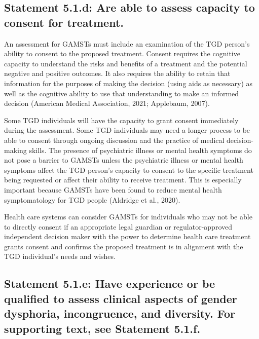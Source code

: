 \documentclass[
]{book}
\begin{document}
\hypertarget{statement-5.1.d-are-able-to-assess-capacity-to-consent-for-treatment.}{%
\subsection*{Statement 5.1.d: Are able to assess capacity to consent for treatment.}\label{statement-5.1.d-are-able-to-assess-capacity-to-consent-for-treatment.}}

An assessment for GAMSTs must include an
examination of the TGD person's ability to consent
to the proposed treatment. Consent requires the
cognitive capacity to understand the risks and
benefits of a treatment and the potential negative
and positive outcomes. It also requires the ability
to retain that information for the purposes of
making the decision (using aids as necessary) as
well as the cognitive ability to use that understanding to make an informed decision (American
Medical Association, 2021; Applebaum, 2007).

Some TGD individuals will have the capacity to
grant consent immediately during the assessment.
Some TGD individuals may need a longer process
to be able to consent through ongoing discussion
and the practice of medical decision-making skills.
The presence of psychiatric illness or mental health
symptoms do not pose a barrier to GAMSTs unless
the psychiatric illness or mental health symptoms
affect the TGD person's capacity to consent to the
specific treatment being requested or affect their
ability to receive treatment. This is especially important because GAMSTs have been found to reduce
mental health symptomatology for TGD people
(Aldridge et al., 2020).

Health care systems can consider GAMSTs for
individuals who may not be able to directly consent if an appropriate legal guardian or
regulator-approved independent decision maker
with the power to determine health care treatment grants consent and confirms the proposed
treatment is in alignment with the TGD individual's needs and wishes.

\hypertarget{statement-5.1.e-have-experience-or-be-qualified-to-assess-clinical-aspects-of-gender-dysphoria-incongruence-and-diversity.-for-supporting-text-see-statement-5.1.f.}{%
\subsection*{Statement 5.1.e: Have experience or be qualified to assess clinical aspects of gender dysphoria, incongruence, and diversity. For supporting text, see Statement 5.1.f.}\label{statement-5.1.e-have-experience-or-be-qualified-to-assess-clinical-aspects-of-gender-dysphoria-incongruence-and-diversity.-for-supporting-text-see-statement-5.1.f.}}
\end{document}
